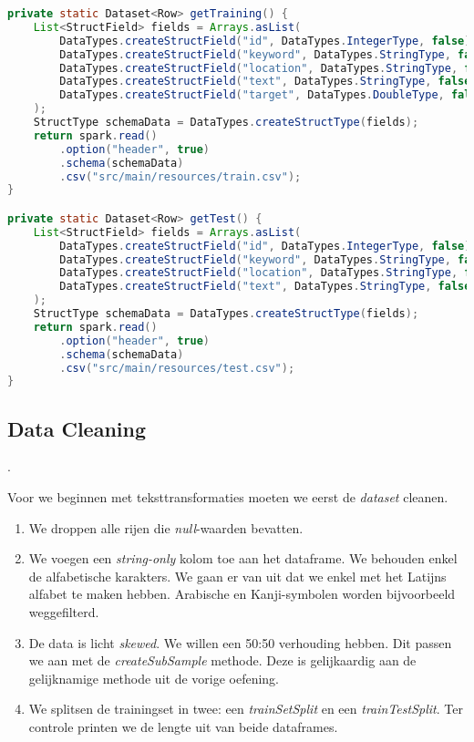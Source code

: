 \documentclass[a4paper,10pt,twoside]{report}
\begin{document}
\begin{lstlisting}[language=Java]
private static Dataset<Row> getTraining() {
	List<StructField> fields = Arrays.asList(
		DataTypes.createStructField("id", DataTypes.IntegerType, false),
		DataTypes.createStructField("keyword", DataTypes.StringType, false),
		DataTypes.createStructField("location", DataTypes.StringType, false),
		DataTypes.createStructField("text", DataTypes.StringType, false),
		DataTypes.createStructField("target", DataTypes.DoubleType, false)
	);
	StructType schemaData = DataTypes.createStructType(fields);
	return spark.read()
		.option("header", true)
		.schema(schemaData)
		.csv("src/main/resources/train.csv");
}

private static Dataset<Row> getTest() {	
	List<StructField> fields = Arrays.asList(
		DataTypes.createStructField("id", DataTypes.IntegerType, false),
		DataTypes.createStructField("keyword", DataTypes.StringType, false),
		DataTypes.createStructField("location", DataTypes.StringType, false),
		DataTypes.createStructField("text", DataTypes.StringType, false)
	);
	StructType schemaData = DataTypes.createStructType(fields);
	return spark.read()
		.option("header", true)
		.schema(schemaData)
		.csv("src/main/resources/test.csv");
}
\end{lstlisting}

\subsection*{Data Cleaning}.

Voor we beginnen met teksttransformaties moeten we eerst de \textit{dataset} cleanen.

\begin{enumerate}
	\item We droppen alle rijen die \textit{null}-waarden bevatten.
	\item We voegen een \textit{string-only} kolom toe aan het dataframe. We behouden enkel de alfabetische karakters. We gaan er van uit dat we enkel met het Latijns alfabet te maken hebben. Arabische en Kanji-symbolen worden bijvoorbeeld weggefilterd.
	\item De data is licht \textit{skewed}. We willen een 50:50 verhouding hebben. Dit passen we aan met de \textit{createSubSample} methode. Deze is gelijkaardig aan de gelijknamige methode uit de vorige oefening.
	\item We splitsen de trainingset in twee: een \textit{trainSetSplit} en een \textit{trainTestSplit}. Ter controle printen we de lengte uit van beide dataframes.
\end{enumerate}
\end{document}
